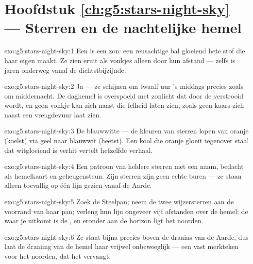 \section*{Hoofdstuk \ref{ch:g5:stars-night-sky} --- Sterren en de nachtelijke hemel}

\begin{solution}{exo:g5:stars-night-sky:1}
Een  is een zon: een reusachtige bal gloeiend hete stof die haar
eigen  maakt. Ze zien eruit als vonkjes alleen door hun afstand
--- zelfs  is jaren onderweg vanaf de dichtstbijzijnde.
\end{solution}

\begin{solution}{exo:g5:stars-night-sky:2}
Ja --- ze schijnen om twaalf uur 's middags precies zoals om
middernacht. De daghemel is overspoeld met zonlicht dat door de
 verstrooid wordt, en geen vonkje kan zich naast die felheid
laten zien, zoals geen kaars zich naast een vreugdevuur laat zien.
\end{solution}

\begin{solution}{exo:g5:stars-night-sky:3}
De blauwwitte --- de kleuren van sterren lopen van oranje (koelst) via
geel naar blauwwit (heetst). Een kool die oranje gloeit tegenover
staal dat witgloeiend is verhit vertelt hetzelfde verhaal.
\end{solution}

\begin{solution}{exo:g5:stars-night-sky:4}
Een patroon van heldere sterren met een naam, bedacht als hemelkaart
en geheugensteun. Zijn sterren zijn geen echte buren --- ze staan
alleen toevallig op één lijn gezien vanaf de Aarde.
\end{solution}

\begin{solution}{exo:g5:stars-night-sky:5}
Zoek de Steelpan; neem de twee wijzersterren aan de voorrand van haar
pan; verleng hun lijn ongeveer vijf afstanden over de hemel; de
 waar je uitkomt is de , en eronder aan de horizon ligt
het noorden.
\end{solution}

\begin{solution}{exo:g5:stars-night-sky:6}
Ze staat bijna precies boven de draaias van de Aarde, dus laat de
draaiing van de hemel haar vrijwel onbeweeglijk --- een vast merkteken
voor het noorden, dat het  vervangt.
\end{solution}

